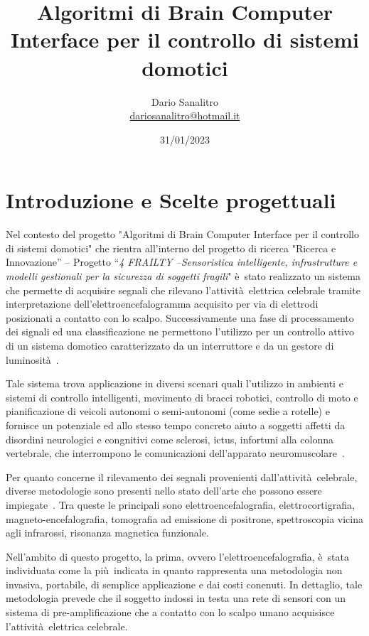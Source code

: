 \documentclass[a4paper]{article}
\title{Algoritmi di Brain Computer Interface per il controllo di sistemi domotici}
\author{Dario Sanalitro \\  \url{dariosanalitro@hotmail.it}}
\date{31/01/2023}
\begin{document}
	\maketitle

\newcommand{\agrave}{\'a~}
\newcommand{\aacuto}{\`a~}
\newcommand{\egrave}{\`e~}
\newcommand{\uacuto}{\`u~}
\newcommand{\iacuto}{\`i~}
\newcommand{\oacuto}{\`o~}

\section{Introduzione e Scelte progettuali}

Nel contesto del progetto "Algoritmi di Brain Computer Interface per il controllo di sistemi domotici" che rientra all'interno del progetto di ricerca "Ricerca e Innovazione” – Progetto “\textit{4 FRAILTY –Sensoristica intelligente, infrastrutture e modelli gestionali per la sicurezza di soggetti fragili}" \egrave stato realizzato un sistema che permette di acquisire segnali che rilevano l'attivit\aacuto elettrica celebrale tramite interpretazione dell'elettroencefalogramma acquisito per via di elettrodi posizionati a contatto con lo scalpo. Successivamente una fase di processamento dei signali ed una classificazione ne permettono l'utilizzo per un controllo attivo di un sistema domotico caratterizzato da un interruttore e da un gestore di luminosit\aacuto.

Tale sistema trova applicazione in diversi scenari quali l'utilizzo in ambienti e sistemi di controllo intelligenti, movimento di bracci robotici, controllo di moto e pianificazione di veicoli autonomi o semi-autonomi (come sedie a rotelle)  e fornisce un potenziale ed allo stesso tempo concreto aiuto a soggetti affetti da disordini neurologici e congnitivi come sclerosi, ictus, infortuni alla colonna vertebrale, che interrompono le comunicazioni dell'apparato neuromuscolare~\cite{2004-Pfu}.

Per quanto concerne il rilevamento dei segnali provenienti dall'attivit\aacuto celebrale, diverse metodologie sono presenti nello stato dell'arte che possono essere impiegate~\cite{2006-Hoc}. Tra queste le principali sono elettroencefalografia, elettrocortigrafia, magneto-encefalografia, tomografia ad emissione di positrone, spettroscopia vicina agli infrarossi, risonanza magnetica funzionale.

Nell'ambito di questo progetto, la prima, ovvero l'elettroencefalografia, \egrave stata individuata come la pi\uacuto indicata in quanto rappresenta una metodologia non invasiva, portabile, di semplice applicazione e dai costi conenuti. In dettaglio, tale metodologia prevede che il soggetto indossi in testa una rete di sensori con un sistema di pre-amplificazione che a contatto con lo scalpo umano acquisisce l'attivit\aacuto elettrica celebrale. 
\end{document}
